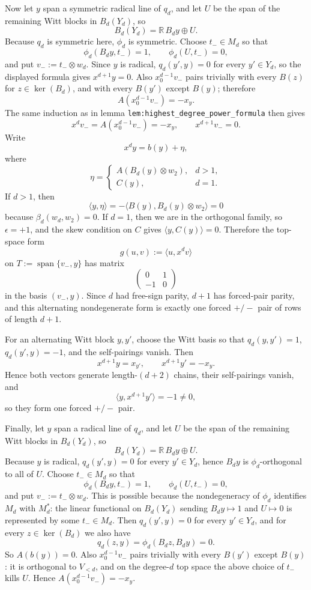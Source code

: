 \documentclass[
]{article}
\begin{document}
Now let \(y\) span a symmetric radical line of \(q_d\), and let \(U\) be
the span of the remaining Witt blocks in \(B_d(Y_d)\), so \[
B_d(Y_d)=\mathbb R\,B_dy\oplus U.
\] Because \(q_d\) is symmetric here, \(\phi_d\) is symmetric. Choose
\(t_-\in M_d\) so that \[
\phi_d(B_dy,t_-)=1,\qquad \phi_d(U,t_-)=0,
\] and put \(v_-:=t_-\otimes w_d\). Since \(y\) is radical,
\(q_d(y',y)=0\) for every \(y'\in Y_d\), so the displayed formula gives
\(x^{d+1}y=0\). Also \(x_0^{d-1}v_-\) pairs trivially with every
\(B(z)\) for \(z\in\ker(B_d)\), and with every \(B(y')\) except
\(B(y)\); therefore \[
A(x_0^{d-1}v_-)=-x_y.
\] The same induction as in lemma
\texttt{lem:highest\_degree\_power\_formula} then gives \[
x^dv_-=A(x_0^{d-1}v_-)=-x_y,\qquad x^{d+1}v_-=0.
\] Write \[
x^dy=b(y)+\eta,
\] where \[
\eta=
\begin{cases}
A(B_d(y)\otimes w_2), & d>1,\\
C(y), & d=1.
\end{cases}
\] If \(d>1\), then \[
\langle y,\eta\rangle=-\langle B(y),B_d(y)\otimes w_2\rangle=0
\] because \(\beta_d(w_d,w_2)=0\). If \(d=1\), then we are in the
orthogonal family, so \(\epsilon=+1\), and the skew condition on \(C\)
gives \(\langle y,C(y)\rangle=0\). Therefore the top-space form \[
g(u,v):=\langle u,x^dv\rangle
\] on \(T:=\operatorname{span}\{v_-,y\}\) has matrix \[
\begin{pmatrix}
0 & 1\\
-1 & 0
\end{pmatrix}
\] in the basis \((v_-,y)\). Since \(d\) had free-sign parity, \(d+1\)
has forced-pair parity, and this alternating nondegenerate form is
exactly one forced \(+/-\) pair of rows of length \(d+1\).

For an alternating Witt block \(y,y'\), choose the Witt basis so that
\(q_d(y,y')=1\), \(q_d(y',y)=-1\), and the self-pairings vanish. Then \[
x^{d+1}y=x_{y'},\qquad x^{d+1}y'=-x_y.
\] Hence both vectors generate length-\((d+2)\) chains, their
self-pairings vanish, and \[
\langle y,x^{d+1}y'\rangle=-1\neq 0,
\] so they form one forced \(+/-\) pair.

Finally, let \(y\) span a radical line of \(q_d\), and let \(U\) be the
span of the remaining Witt blocks in \(B_d(Y_d)\), so \[
B_d(Y_d)=\mathbb R\,B_dy\oplus U.
\] Because \(y\) is radical, \(q_d(y',y)=0\) for every \(y'\in Y_d\),
hence \(B_dy\) is \(\phi_d\)-orthogonal to all of \(U\). Choose
\(t_-\in M_d\) so that \[
\phi_d(B_dy,t_-)=1,\qquad \phi_d(U,t_-)=0,
\] and put \(v_-:=t_-\otimes w_d\). This is possible because the
nondegeneracy of \(\phi_d\) identifies \(M_d\) with \(M_d^\ast\): the
linear functional on \(B_d(Y_d)\) sending \(B_dy\mapsto 1\) and
\(U\mapsto 0\) is represented by some \(t_-\in M_d\). Then
\(q_d(y',y)=0\) for every \(y'\in Y_d\), and for every
\(z\in \ker(B_d)\) we also have \[
q_d(z,y)=\phi_d(B_dz,B_dy)=0.
\] So \(A(b(y))=0\). Also \(x_0^{d-1}v_-\) pairs trivially with every
\(B(y')\) except \(B(y)\): it is orthogonal to \(V_{<d}\), and on the
degree-\(d\) top space the above choice of \(t_-\) kills \(U\). Hence
\(A(x_0^{d-1}v_-)=-x_y\).
\end{document}
